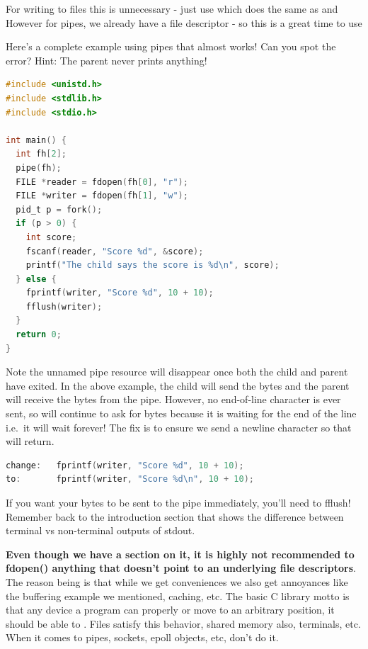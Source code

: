 For writing to files this is unnecessary - just use  which does the same as  and  However for pipes, we already have a file descriptor - so this is a great time to use 

Here's a complete example using pipes that almost works!
Can you spot the error?
Hint: The parent never prints anything!

\begin{lstlisting}[language=C]
#include <unistd.h>
#include <stdlib.h>
#include <stdio.h>

int main() {
  int fh[2];
  pipe(fh);
  FILE *reader = fdopen(fh[0], "r");
  FILE *writer = fdopen(fh[1], "w");
  pid_t p = fork();
  if (p > 0) {
    int score;
    fscanf(reader, "Score %d", &score);
    printf("The child says the score is %d\n", score);
  } else {
    fprintf(writer, "Score %d", 10 + 10);
    fflush(writer);
  }
  return 0;
}
\end{lstlisting}

Note the unnamed pipe resource will disappear once both the child and parent have exited.
In the above example, the child will send the bytes and the parent will receive the bytes from the pipe.
However, no end-of-line character is ever sent, so  will continue to ask for bytes because it is waiting for the end of the line i.e.~it will wait forever! The fix is to ensure we send a newline character so that  will return.

\begin{lstlisting}[language=C]
change:   fprintf(writer, "Score %d", 10 + 10);
to:       fprintf(writer, "Score %d\n", 10 + 10);
\end{lstlisting}

If you want your bytes to be sent to the pipe immediately, you'll need to fflush!
Remember back to the introduction section that shows the difference between terminal vs non-terminal outputs of stdout.

\textbf{Even though we have a section on it, it is highly not recommended to fdopen() anything that doesn't point to an underlying file descriptors}.
The reason being is that while we get conveniences we also get annoyances like the buffering example we mentioned, caching, etc.
The basic C library motto is that any device a program can properly  or move to an arbitrary position, it should be able to .
Files satisfy this behavior, shared memory also, terminals, etc.
When it comes to pipes, sockets, epoll objects, etc, don't do it.

